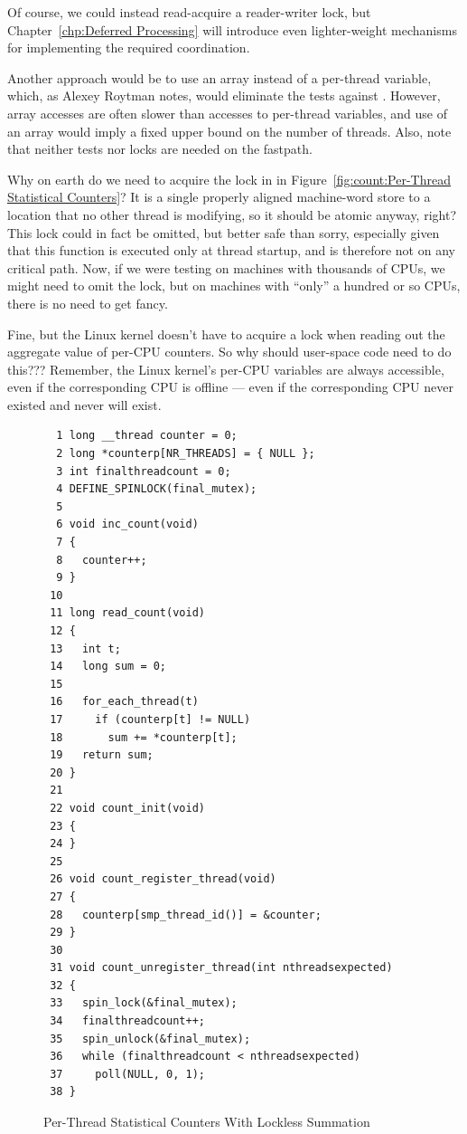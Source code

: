 	Of course, we could instead read-acquire a reader-writer lock,
	but Chapter~\ref{chp:Deferred Processing} will introduce even
	lighter-weight mechanisms for implementing the required coordination.

	Another approach would be to use an array instead of a per-thread
	variable, which, as Alexey Roytman notes, would eliminate
	the tests against .
	However, array accesses are often slower than accesses to
	per-thread variables, and use of an array would imply a
	fixed upper bound on the number of threads.
	Also, note that neither tests nor locks are needed on the
	 fastpath.

\QuickQ{}
	Why on earth do we need to acquire the lock in
	 in
	Figure~\ref{fig:count:Per-Thread Statistical Counters}?
	It is a single properly aligned machine-word store to a location
	that no other thread is modifying, so it should be atomic anyway,
	right?
\QuickA{}
	This lock could in fact be omitted, but better safe than
	sorry, especially given that this function is executed only at
	thread startup, and is therefore not on any critical path.
	Now, if we were testing on machines with thousands of CPUs,
	we might need to omit the lock, but on machines with ``only''
	a hundred or so CPUs, there is no need to get fancy.

\QuickQ{}
	Fine, but the Linux kernel doesn't have to acquire a lock
	when reading out the aggregate value of per-CPU counters.
	So why should user-space code need to do this???
\QuickA{}
	Remember, the Linux kernel's per-CPU variables are always
	accessible, even if the corresponding CPU is offline --- even
	if the corresponding CPU never existed and never will exist.

\begin{figure}[tbp]
{ \scriptsize
\begin{verbatim}
  1 long __thread counter = 0;
  2 long *counterp[NR_THREADS] = { NULL };
  3 int finalthreadcount = 0;
  4 DEFINE_SPINLOCK(final_mutex);
  5 
  6 void inc_count(void)
  7 {
  8   counter++;
  9 }
 10 
 11 long read_count(void)
 12 {
 13   int t;
 14   long sum = 0;
 15 
 16   for_each_thread(t)
 17     if (counterp[t] != NULL)
 18       sum += *counterp[t];
 19   return sum;
 20 }
 21 
 22 void count_init(void)
 23 {
 24 }
 25 
 26 void count_register_thread(void)
 27 {
 28   counterp[smp_thread_id()] = &counter;
 29 }
 30 
 31 void count_unregister_thread(int nthreadsexpected)
 32 {
 33   spin_lock(&final_mutex);
 34   finalthreadcount++;
 35   spin_unlock(&final_mutex);
 36   while (finalthreadcount < nthreadsexpected)
 37     poll(NULL, 0, 1);
 38 }
\end{verbatim}
}
\caption{Per-Thread Statistical Counters With Lockless Summation}
\label{fig:count:Per-Thread Statistical Counters With Lockless Summation}
\end{figure}

